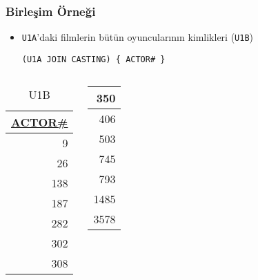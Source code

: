 \documentclass[dvipsnames]{beamer}
\theoremstyle{plain}
\begin{document}
\begin{frame}[fragile]
  \frametitle{Birleşim Örneği}

    \begin{itemize}
      \item \texttt{U1A}'daki filmlerin bütün oyuncularının kimlikleri (\texttt{U1B})

    \begin{lstlisting}
(U1A JOIN CASTING) { ACTOR# }
    \end{lstlisting}
    \end{itemize}

    \vspace{-10pt}
    \begin{columns}[b]
      \begin{tiny}
      \begin{table}
        \caption{U1B}
        \begin{tabular}{|r|}\hline
\underline{ACTOR\#}\\[2pt]\hline\hline
                  9\\\hline
                 26\\\hline
                138\\\hline
                187\\\hline
                282\\\hline
                302\\\hline
                308\\\hline
        \end{tabular}
      \end{table}
      \end{tiny}

      \begin{tiny}
      \begin{table}
        \begin{tabular}{|r|}\hline
                350\\\hline
                406\\\hline
                503\\\hline
                745\\\hline
                793\\\hline
               1485\\\hline
               3578\\\hline
        \end{tabular}
      \end{table}
      \end{tiny}
    \end{columns}
\end{frame}
\end{document}
